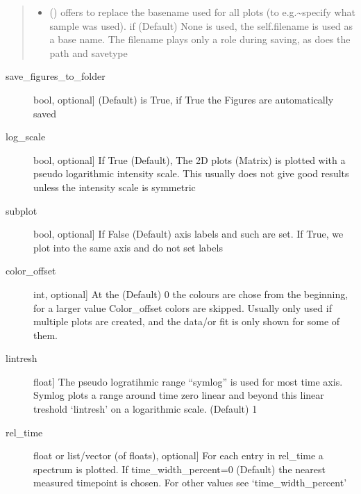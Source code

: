 \documentclass[letterpaper,10pt,english]{sphinxmanual}
\begin{document}
\begin{fulllineitems}
\begin{quote}
\begin{description}
\begin{itemize}
\item {} 
 (\sphinxstyleliteralemphasis{\sphinxupquote{, }}) \textendash{} offers to replace the base\sphinxhyphen{}name used for all plots (to e.g.\textasciitilde{}specify what sample was used).
if (Default) None is used, the self.filename is used as a base name. The filename plays only a
role during saving, as does the path and savetype

\end{itemize}

\end{description}\end{quote}
\begin{description}
\item[{save\_figures\_to\_folder}] \leavevmode{[}bool, optional{]}
(Default) is True, if True the Figures are automatically saved

\item[{log\_scale}] \leavevmode{[}bool, optional{]}
If True (Default), The 2D plots (Matrix) is plotted with a pseudo logarithmic intensity scale.
This usually does not give good results unless the intensity scale is symmetric

\item[{subplot}] \leavevmode{[}bool, optional{]}
If False (Default) axis labels and such are set. If True, we plot into the same axis and
do not set labels

\item[{color\_offset}] \leavevmode{[}int, optional{]}
At the (Default) 0 the colours are chose from the beginning, for a larger value Color\_offset
colors are skipped. Usually only used if multiple plots are created, and the data/or fit is
only shown for some of them.

\item[{lintresh}] \leavevmode{[}float{]}
The pseudo logratihmic range “symlog” is used for most time axis. Symlog plots a range around
time zero linear and beyond this linear treshold ‘lintresh’ on a logarithmic scale. (Default) 1

\item[{rel\_time}] \leavevmode{[}float or list/vector (of floats), optional{]}
For each entry in rel\_time a spectrum is plotted. If time\_width\_percent=0 (Default) the
nearest measured timepoint is chosen. For other values see ‘time\_width\_percent’


\end{description}
\end{fulllineitems}
\end{document}
